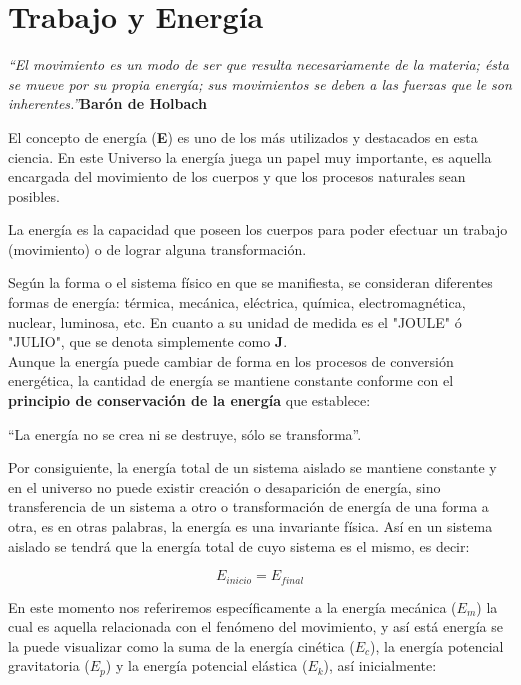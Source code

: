 \chapter{Trabajo y Energía}

\textit{``El movimiento es un modo de ser que resulta necesariamente de la materia; ésta se mueve por su propia energía; sus 
movimientos se deben a las fuerzas que le son inherentes.''}\textbf{Barón de Holbach}\vspace{1.0 cm}

El concepto de energía (\textbf{E}) es uno de los más utilizados y destacados en esta ciencia. En este Universo la energía juega 
un papel muy importante, es aquella encargada del movimiento de los cuerpos y que los procesos naturales sean posibles.

\begin{tcolorbox}
La energía es la capacidad que poseen los cuerpos para poder efectuar un trabajo (movimiento) o de lograr alguna transformación.  
\end{tcolorbox}

Según la forma o el sistema físico en que se manifiesta, se consideran diferentes formas de energía: térmica, mecánica, 
eléctrica, 
química, electromagnética, nuclear, luminosa, etc. En cuanto a su unidad de medida es el "JOULE" ó "JULIO", que se denota 
simplemente como \textbf{J}.\\

Aunque la energía puede cambiar de forma en los procesos de conversión energética, la cantidad de energía se mantiene constante 
conforme con el \textbf{principio de conservación de la energía} que establece:

\begin{tcolorbox}
``La energía no se crea ni se destruye, sólo se transforma''. 
\end{tcolorbox}

Por consiguiente, la energía total de un sistema aislado se mantiene constante y en el universo no puede existir creación o 
desaparición de energía, sino transferencia de un sistema a otro o transformación de energía de una forma a otra, es en otras 
palabras, la energía es una invariante física. Así en un sistema aislado se tendrá que la energía total de cuyo sistema es el 
mismo, es decir:

\begin{equation}
E_{inicio} = E_{final}
\end{equation}

En este momento nos referiremos específicamente a la energía mecánica ($E_m$) la cual es aquella relacionada con el fenómeno del 
movimiento, y así está energía se la puede visualizar como la suma de la energía cinética ($E_c$), la energía potencial 
gravitatoria ($E_p$) y la energía potencial elástica ($E_k$), así inicialmente:


